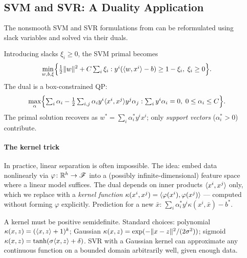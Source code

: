 \subsection{SVM and SVR: A Duality Application}\label{ssec:svm-duality}

The nonsmooth SVM and SVR formulations from  can be reformulated using slack variables and solved via their duals.

Introducing slacks $\xi_i \geq 0$, the SVM primal becomes
\begin{equation}\label{eq:svm-primal-slack}
	\min_{w, b, \xi}\Bigl\{\tfrac{1}{2}\lVert w\rVert^2 + C\textstyle\sum_i \xi_i : y^i(\langle w, x^i\rangle - b) \geq 1 - \xi_i,\; \xi_i \geq 0\Bigr\}.
\end{equation}
The dual is a box-constrained QP:
\begin{equation}\label{eq:svm-dual}
	\max_\alpha\Bigl\{\textstyle\sum_i \alpha_i - \frac{1}{2}\sum_{i,j} \alpha_i y^i \langle x^i, x^j\rangle y^j \alpha_j : \sum_i y^i \alpha_i = 0,\; 0 \leq \alpha_i \leq C\Bigr\}.
\end{equation}
The primal solution recovers as $w^* = \sum_i \alpha_i^* y^i x^i$; only \textit{support vectors} ($\alpha_i^* > 0$) contribute.

\paragraph{The kernel trick}

In practice, linear separation is often impossible.
The idea: embed data nonlinearly via $\varphi \colon \mathbb{R}^h \to \mathcal{F}$ into a (possibly infinite-dimensional) feature space where a linear model suffices.
The dual depends on inner products $\langle x^i, x^j\rangle$ only, which we replace with a \textit{kernel function} $\kappa(x^i, x^j) = \langle\varphi(x^i), \varphi(x^j)\rangle$ --- computed without forming $\varphi$ explicitly.
Prediction for a new $\bar{x}$: $\sum_i \alpha_i^* y^i \kappa(x^i, \bar{x}) - b^*$.

A kernel must be positive semidefinite.
Standard choices: polynomial $\kappa(x, z) = (\langle x, z\rangle + 1)^k$; Gaussian $\kappa(x, z) = \exp(-\lVert x-z\rVert^2 / (2\sigma^2))$; sigmoid $\kappa(x, z) = \tanh(\sigma\langle x, z\rangle + \delta)$.
SVR with a Gaussian kernel can approximate any continuous function on a bounded domain arbitrarily well, given enough data.